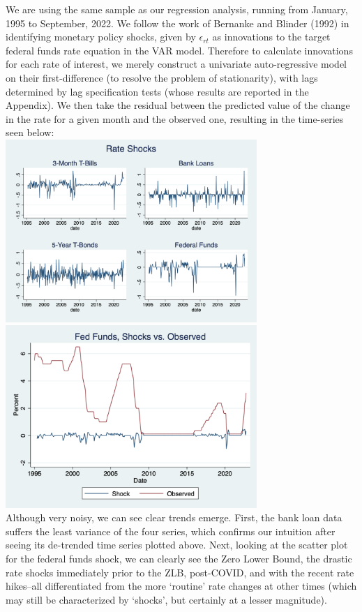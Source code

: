 \documentclass[12pt,final]{article}
\begin{document}
We are using the same sample as our regression analysis, running from January, 1995 to September, 2022. We follow the work of Bernanke and Blinder (1992) in identifying monetary policy shocks, given by $\epsilon_{rt}$ as innovations to the target federal funds rate equation in the VAR model. \citep{Bernanke1990} Therefore to calculate innovations for each rate of interest, we merely construct a univariate auto-regressive model on their first-difference (to resolve the problem of stationarity), with lags determined by lag specification tests (whose results are reported in the Appendix). We then take the residual between the predicted value of the change in the rate for a given month and the observed one, resulting in the time-series seen below:  \\
\includegraphics[width=3.75in]{shock_tsline.png} \includegraphics[width=3.75in]{shock_obs.png} \\
Although very noisy, we can see clear trends emerge. First, the bank loan data suffers the least variance of the four series, which confirms our intuition after seeing its de-trended time series plotted above. Next, looking at the scatter plot for the federal funds shock, we can clearly see the Zero Lower Bound, the drastic rate shocks immediately prior to the ZLB, post-COVID, and with the recent rate hikes--all differentiated from the more `routine' rate changes at other times (which may still be characterized by `shocks', but certainly at a lesser magnitude).
\end{document}
